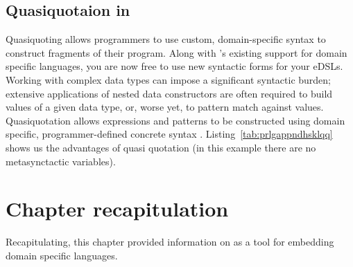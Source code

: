 \documentclass[thesis-solanki.tex]{subfiles}
\begin{document}
\subsection{Quasiquotaion in }

Quasiquoting allows programmers to use custom, domain-specific syntax to construct fragments of their program.
Along with 's existing support for domain specific languages, you are now free to use new
syntactic forms for your eDSLs.
Working with complex data types can impose a significant syntactic burden; extensive applications of nested data
constructors are often required to build values of a given data type, or, worse yet, to pattern match against
values.
Quasiquotation allows  expressions and patterns to be constructed using domain specific, programmer-defined
concrete syntax \cite{haskellquasi, mainland2007s}.
Listing~\ref{tab:prlgappndhsklqq} shows us the advantages of quasi quotation (in this example there are no
metasynctactic variables).


\section{Chapter recapitulation}
Recapitulating, this chapter provided information on  as a tool for embedding domain specific
languages. 


\ifMain\ifDraft
\begin{scope}
  \nolinenumbers
  \enotesize
  \par
  \begin{singlespace}
  \setlength{\parskip}{12pt plus 2pt minus 1pt}
  \theendnotes
  \par
  \end{singlespace}
\end{scope}
\fi\fi
\end{document}
